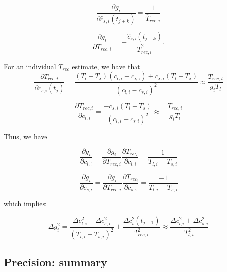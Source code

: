 \begin{equation}
\frac{\partial g_{i}}{\partial \hat{c}_{s,i}(t_{j+k})} = \frac{1}{\overline{T}_{rec,i}}
\end{equation}

\begin{equation}
\frac{\partial g_{i}}{\partial T_{rec,i}} = - \frac{\hat{c}_{s,i}(t_{j+k})}{\overline{T}_{rec,i}^2}.
\end{equation}

For an individual \(T_{rec}\) estimate, we have that
\begin{equation}
 \frac{\partial T_{rec,i}}{\partial c_{s,i}(t_{j})} = \frac{(T_{l}-T_{s})(c_{l,i}-c_{s,i}) + c_{s,i}(T_{l}-T_{s})}
{(c_{l,i}-c_{s,i})^2} \approx \frac{T_{rec,i}}{g_{i}T_{l}}
\end{equation}

\begin{equation}
 \frac{\partial T_{rec,i}}{\partial c_{l,i}} = \frac{-c_{s,i}(T_{l}-T_{s})}{(c_{l,i}-c_{s,i})^2} \approx -\frac{T_{rec,i}}{g_{i}T_{l}}
\end{equation}

Thus, we have

\begin{equation}
 \frac{\partial g_{i}}{\partial c_{l,i}} = \frac{\partial g_{i}}{\partial T_{rec,i}}\frac{\partial T_{rec_{i}}}{\partial c_{l,i}}=
\frac{1}{T_{l,i}-T_{s,i}} 
\end{equation}

\begin{equation}
 \frac{\partial g_{i}}{\partial c_{s,i}} = \frac{\partial g_{i}}{\partial T_{rec,i}}\frac{\partial T_{rec_{i}}}{\partial c_{s,i}} =
\frac{-1}{T_{l,i}-T_{s,i}} 
\end{equation}

which implies:

\begin{equation}
\Delta g_{i}^{2} =  \frac{\Delta c_{l,i}^{2} + \Delta c_{s,i}^{2}}{(T_{l,i}-T_{s,i})^2} + \frac{ \Delta c_{i}^{2}(t_{j+1})}{T_{rec,i}^{2}}
\approx \frac{\Delta c_{l,i}^{2} + \Delta c_{s,i}^{2}}{T_{l,i}^2}
\end{equation}
 

\subsection*{Precision: summary}

